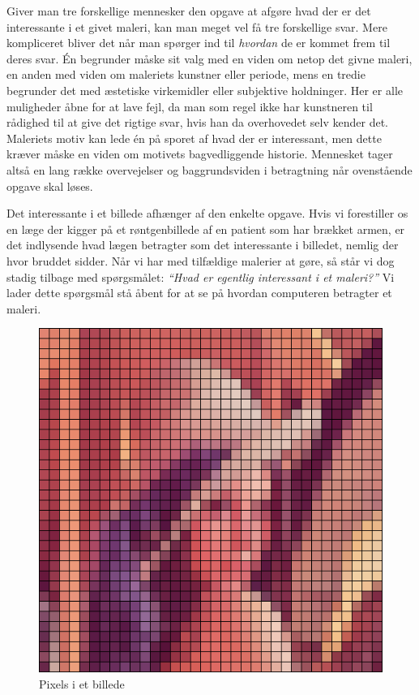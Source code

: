 {
Giver man tre forskellige mennesker den opgave at afgøre hvad der er det
interessante i et givet maleri, kan man meget vel få tre forskellige
svar. Mere kompliceret bliver det når man spørger ind til \emph{hvordan}
de er kommet frem til deres svar. Én begrunder måske sit valg med en
viden om netop det givne maleri, en anden med viden om maleriets
kunstner eller periode, mens en tredie begrunder det med æstetiske
virkemidler eller subjektive holdninger. Her er alle muligheder åbne for
at lave fejl, da man som regel ikke har kunstneren til rådighed til at
give det rigtige svar, hvis han da overhovedet selv kender det.
Maleriets motiv kan lede én på sporet af hvad der er interessant, men
dette kræver måske en viden om motivets bagvedliggende historie.
Mennesket tager altså en lang række overvejelser og baggrundsviden i
betragtning når ovenstående opgave skal løses.

Det interessante i et billede afhænger af den enkelte opgave.  Hvis vi
forestiller os en læge der kigger på et røntgenbillede af en patient som
har brækket armen, er det indlysende hvad lægen betragter som det
interessante i billedet, nemlig der hvor bruddet sidder. Når vi har med
tilfældige malerier at gøre, så står vi dog stadig tilbage med
spørgsmålet: \emph{``Hvad er egentlig \emph{interessant} i et maleri?''}
Vi lader dette spørgsmål stå åbent for at se på hvordan computeren
betragter et maleri.

\begin{figure}[h]
    \centering
    \includegraphics[scale=0.3]{afsnit/baggrund/billeder/pixel_lena}
    \caption[]{Pixels i et billede}
    \label{pixel_lena}
\end{figure}

}

